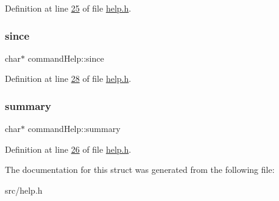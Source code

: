 Definition at line \hyperlink{help_8h_source_l00025}{25} of file \hyperlink{help_8h_source}{help.\+h}.

\mbox{\label{structcommandHelp_a8d06ba546d92db2e1a4590eaa1116c1f}} 
\subsubsection{\texorpdfstring{since}{since}}
{\footnotesize\ttfamily char$\ast$ command\+Help\+::since}



Definition at line \hyperlink{help_8h_source_l00028}{28} of file \hyperlink{help_8h_source}{help.\+h}.

\mbox{\label{structcommandHelp_ad4ea8c85da889c0e3afb61a753ace373}} 
\subsubsection{\texorpdfstring{summary}{summary}}
{\footnotesize\ttfamily char$\ast$ command\+Help\+::summary}



Definition at line \hyperlink{help_8h_source_l00026}{26} of file \hyperlink{help_8h_source}{help.\+h}.



The documentation for this struct was generated from the following file\+:\begin{DoxyCompactItemize}
\item 
src/help.\+h\end{DoxyCompactItemize}
